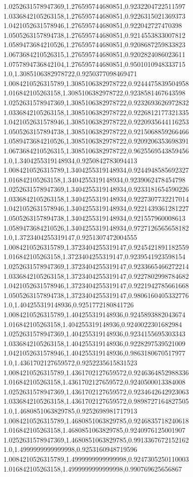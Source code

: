 1.0252631578947369,1.276595744680851,0.9232204722511597
1.0336842105263158,1.276595744680851,0.9226315021369373
1.0421052631578946,1.276595744680851,0.922042727470398
1.0505263157894738,1.276595744680851,0.9214553833007812
1.0589473684210526,1.276595744680851,0.9208687259833823
1.0673684210526315,1.276595744680851,0.9202824086023611
1.0757894736842104,1.276595744680851,0.9501010948333715
1.0,1.3085106382978722,0.9250377098469471
1.0084210526315789,1.3085106382978722,0.9244475839504958
1.016842105263158,1.3085106382978722,0.9238581467643598
1.0252631578947369,1.3085106382978722,0.9232693626972832
1.0336842105263158,1.3085106382978722,0.9226812177321335
1.0421052631578946,1.3085106382978722,0.9220935644116253
1.0505263157894738,1.3085106382978722,0.9215068859266466
1.0589473684210526,1.3085106382978722,0.9209206353698391
1.0673684210526315,1.3085106382978722,0.9625569543859456
1.0,1.3404255319148934,0.9250842783094413
1.0084210526315789,1.3404255319148934,0.9244948585692327
1.016842105263158,1.3404255319148934,0.9239062478454798
1.0252631578947369,1.3404255319148934,0.9233181654590226
1.0336842105263158,1.3404255319148934,0.9227307732217014
1.0421052631578946,1.3404255319148934,0.9221439361281227
1.0505263157894738,1.3404255319148934,0.921557960008613
1.0589473684210526,1.3404255319148934,0.9727126565658182
1.0,1.3723404255319147,0.9251307472004555
1.0084210526315789,1.3723404255319147,0.9245421891182559
1.016842105263158,1.3723404255319147,0.9239541923598154
1.0252631578947369,1.3723404255319147,0.9233665466272214
1.0336842105263158,1.3723404255319147,0.9227802998784682
1.0421052631578946,1.3723404255319147,0.9221942785661668
1.0505263157894738,1.3723404255319147,0.9806160405332776
1.0,1.404255319148936,0.9251772180841726
1.0084210526315789,1.404255319148936,0.9245893882043674
1.016842105263158,1.404255319148936,0.9240022301682984
1.0252631578947369,1.404255319148936,0.9234155695303343
1.0336842105263158,1.404255319148936,0.9228297539521009
1.0421052631578946,1.404255319148936,0.9863180670517977
1.0,1.4361702127659572,0.9252235615831523
1.0084210526315789,1.4361702127659572,0.9246364852988336
1.016842105263158,1.4361702127659572,0.9240500013384008
1.0252631578947369,1.4361702127659572,0.9234642642923063
1.0336842105263158,1.4361702127659572,0.9898727164827505
1.0,1.4680851063829785,0.9252698981717913
1.0084210526315789,1.4680851063829785,0.9246835718240618
1.016842105263158,1.4680851063829785,0.9240976125001907
1.0252631578947369,1.4680851063829785,0.9913367672152162
1.0,1.4999999999999998,0.9253160948719596
1.0084210526315789,1.4999999999999998,0.9247305250110003
1.016842105263158,1.4999999999999998,0.990769625656867
